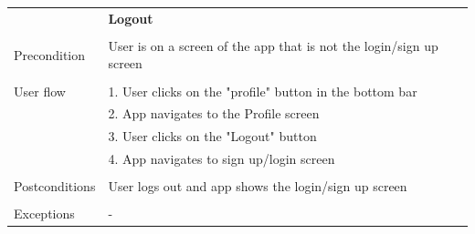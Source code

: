 \documentclass[10pt]{article}
\begin{document}
        \newline
    \newline
    \newline
    \begin{tabular}{ p{3cm}|p{8cm} }
     & \textbf{Logout} \\
     \\
     Precondition & User is on a screen of the app that is not the login/sign up screen \\ 
     \\
     User flow 
     & 1. User clicks on the "profile" button in the bottom bar  \\
     & 2. App navigates to the Profile screen \\ 
     & 3. User clicks on the "Logout" button \\ 
     & 4. App navigates to sign up/login screen \\
     \\
     Postconditions & User logs out and app shows the login/sign up screen \\
     \\
     Exceptions & -\\
    \end{tabular}
    
	
	
\end{document}
